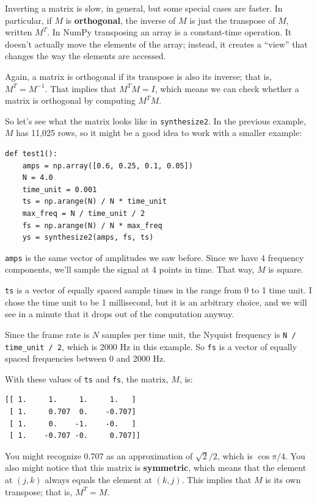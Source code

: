 \documentclass[12pt]{book}
\begin{document}
Inverting a matrix is slow, in general, but some special cases are
faster.  In particular, if $M$ is {\bf orthogonal}, the inverse of $M$
is just the transpose of $M$, written $M^T$.  In NumPy
transposing an array is a constant-time operation.  It
doesn't actually move the elements of the array; instead, it creates a
``view'' that changes the way the elements are accessed.

Again, a matrix is orthogonal if its transpose is also its inverse;
that is, $M^T = M^{-1}$.  That implies that $M^TM = I$, which means we
can check whether a matrix is orthogonal by computing $M^TM$.

So let's see what the matrix looks like in {\tt synthesize2}.  In 
the previous example, $M$ has 11,025 rows, so it might be a good idea
to work with a smaller example:

\begin{verbatim}
def test1():
    amps = np.array([0.6, 0.25, 0.1, 0.05])
    N = 4.0
    time_unit = 0.001
    ts = np.arange(N) / N * time_unit
    max_freq = N / time_unit / 2
    fs = np.arange(N) / N * max_freq
    ys = synthesize2(amps, fs, ts)
\end{verbatim}

{\tt amps} is the same vector of amplitudes we saw before.
Since we have 4 frequency components, we'll sample the signal
at 4 points in time.  That way, $M$ is square.

{\tt ts} is a vector of equally spaced sample times in the range from
0 to 1 time unit.  I chose the time unit to be 1 millisecond, but it
is an arbitrary choice, and we will see in a minute that it drops out
of the computation anyway.

Since the frame rate is $N$ samples per time unit, the Nyquist
frequency is \verb"N / time_unit / 2", which is 2000 Hz in this
example.  So {\tt fs} is a vector of equally spaced frequencies
between 0 and 2000 Hz.

With these values of {\tt ts} and {\tt fs}, the matrix, $M$, is:

\begin{verbatim}
[[ 1.     1.     1.     1.   ]
 [ 1.     0.707  0.    -0.707]
 [ 1.     0.    -1.    -0.   ]
 [ 1.    -0.707 -0.     0.707]]
\end{verbatim}

You might recognize 0.707 as an approximation of $\sqrt{2}/2$,
which is $\cos \pi/4$.  You also might notice that this matrix
is {\bf symmetric}, which means that the element at $(j, k)$ always
equals the element at $(k, j)$.  This implies that $M$ is its own
transpose; that is, $M^T = M$.
\end{document}
